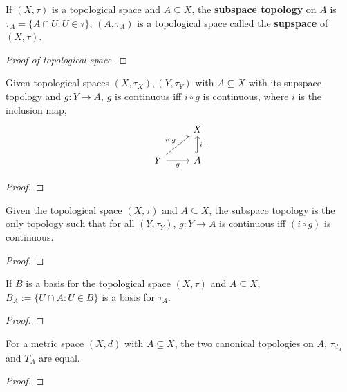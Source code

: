 \documentclass[../Year2.tex]{subfiles}
\begin{document}
\begin{definition}[Subspace]
    If $(X,\tau)$ is a topological space and $A\subseteq X$, the \textbf{subspace topology} on $A$ is $\tau_A=\{A\cap U: U\in\tau\}$, $(A,\tau_A)$ is a topological space called the \textbf{supspace} of $(X,\tau)$.
    \begin{proof}[Proof of topological space]
        
    \end{proof}
\end{definition}

\begin{proposition}
    Given topological spaces $(X,\tau_X), (Y,\tau_Y)$ with $A\subseteq X$ with its supspace topology and $g:Y\rightarrow A$, $g$ is continuous iff $i\circ g$ is continuous, where $i$ is the inclusion map, \[
        \begin{tikzcd}
            & X \\
            Y \arrow[ur, "i\circ g"] \arrow[r, swap, "g"] & A \arrow[u, swap, hook, "i"]
        \end{tikzcd}
        \black{.}
    \]
    \begin{proof}
        
    \end{proof}
\end{proposition}

\begin{theorem}
    Given the topological space $(X,\tau)$ and $A\subseteq X$, the subspace topology is the only topology such that for all $(Y,\tau_Y)$, $g:Y\rightarrow A$ is continuous iff $(i\circ g)$ is continuous.
    \begin{proof}
        
    \end{proof}
\end{theorem}

\begin{lemma}
    If $B$ is a basis for the topological space $(X,\tau)$ and $A\subseteq X$, $B_A:=\{U\cap A:U\in B\}$ is a basis for $\tau_A$.
    \begin{proof}
        
    \end{proof}
\end{lemma}

\begin{proposition}
    For a metric space $(X,d)$ with $A\subseteq X$, the two canonical topologies on $A$, $\tau_{d_A}$ and $T_A$ are equal. \begin{proof}
        
    \end{proof}
\end{proposition}
\end{document}
